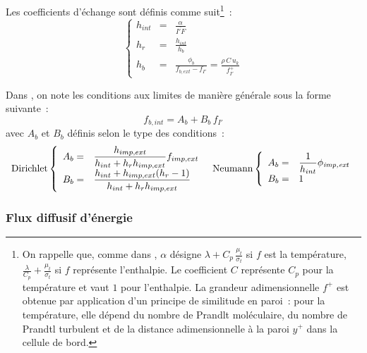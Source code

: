 Les coefficients d'échange sont définis comme suit\footnote{On rappelle que, comme
dans , $\alpha$ désigne $\lambda+C_p\,\frac{\mu_t}{\sigma_t}$
si $f$ est la température,
$\frac{\lambda}{C_p}+\frac{\mu_t}{\sigma_t}$ si $f$ représente l'enthalpie.
Le coefficient $C$ représente $C_p$ pour la température et vaut
$1$ pour l'enthalpie. La grandeur adimensionnelle $f^+$ est obtenue par
application d'un principe de similitude en paroi~: pour la température,
elle dépend du nombre de
Prandlt moléculaire, du nombre de Prandtl turbulent et de la distance adimensionnelle à la paroi $y^+$ dans la cellule de bord.}~:
\begin{equation}
\left\{\begin{array}{lll}
h_{int}&=&\displaystyle\frac{\alpha}{\overline{I'F}}\\
h_r&=&\displaystyle\frac{h_{int}}{h_{b}} \\
h_b&=&\displaystyle\frac{\phi_b}{f_{b,ext}-f_{I'}}=\frac{\rho\,C\,u_k}{f^+_{I'}}
\end{array}\right.
\end{equation}

Dans \CS, on note les conditions aux limites de manière générale sous
la forme suivante~:
\begin{equation}
f_{b,int}=A_b + B_b\,f_{I'}
\end{equation}
avec $A_b$ et $B_b$ définis selon le type des conditions~:
\begin{equation}
\begin{array}{c}
\text{Dirichlet}\left\{\begin{array}{ll}
    A_b = &\displaystyle\frac{h_{imp,ext}}{h_{int}+h_r h_{imp,ext} } f_{imp,ext}\\
    B_b = &\displaystyle\frac{h_{int}+h_{imp,ext}(h_r-1)}{h_{int}+h_r h_{imp,ext} }
                  \end{array}\right.
\text{\ \  Neumann}\left\{\begin{array}{ll}
    A_b = &\displaystyle\frac{1}{h_{int}}\phi_{\text{\it imp,ext}}\\
    B_b = &1
                  \end{array}\right.
\end{array}
\end{equation}

\subsubsection*{Flux diffusif d'énergie}

